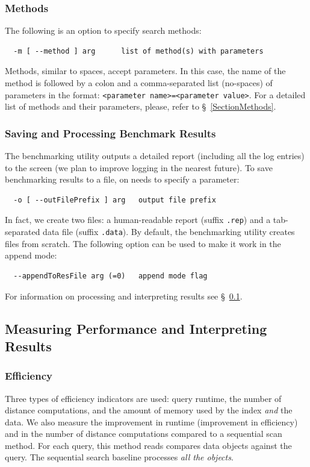 \documentclass[runningheads,a4paper]{llncs}
\newcommand{\ttt}[1]{\texttt{#1}}
\begin{document}
{\subsubsection{Methods}
The following is an option to specify search methods:
\begin{verbatim}
  -m [ --method ] arg      list of method(s) with parameters
\end{verbatim}
Methods, similar to spaces, accept parameters. 
In this case,
the name of the method is followed by a colon and a comma-separated list (no-spaces)
of parameters in the format:
\ttt{<parameter name>=<parameter value>}.
For a detailed list of methods and their parameters, please, refer to \S~\ref{SectionMethods}.

\subsubsection{Saving and Processing Benchmark Results}
The benchmarking utility outputs a detailed report (including all the log entries) to the screen
(we plan to improve logging in the nearest future).
To save benchmarking results to a file, on needs to specify a parameter:
\begin{verbatim}
  -o [ --outFilePrefix ] arg   output file prefix
\end{verbatim}
In fact, we create two files: a human-readable report (suffix \ttt{.rep}) and 
a tab-separated data file (suffix \ttt{.data}).
By default, the benchmarking utility creates files from scratch. The
following option can be used to make it work in the append mode:
\begin{verbatim}
  --appendToResFile arg (=0)   append mode flag
\end{verbatim}
For information on processing and interpreting results see \S~\ref{SectionMeasurePerf}.

\subsection{Measuring Performance and Interpreting Results}\label{SectionMeasurePerf}
\subsubsection{Efficiency}
Three types of efficiency indicators are used: query runtime, the number of distance computations,
and the amount of memory used by the index \emph{and} the data.
We also measure the improvement in runtime (improvement in efficiency) 
and in the number of distance computations compared to a sequential scan method. 
For each query, this method reads compares data objects against the query.
The sequential search baseline processes \emph{all the objects}. 

}
\end{document}

